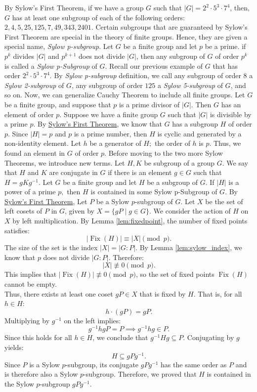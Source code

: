 \documentclass[a4paper,12pt]{article}
\begin{document}
By Sylow's First Theorem, if we have a group $G$ such that $|G|= 2^2 \cdot 5^3 \cdot 7^4$, then, $G$ has at least one subgroup of each of the following orders: $2,4,5,25,125,7,49,343,2401.$ Certain subgroups that are guaranteed by Sylow's First Theorem are special in the theory of finite groups. Hence, they are given a special name, \textit{Sylow p-subgroup}.
{
    Let $G$ be a finite group and let $p$ be a prime. if $p^k$ divides $|G|$ and $p^{k+1}$ does not divide $|G|$, then any subgroup of $G$ of order $p^k$ is called a \textit{Sylow p-Subgroup} of $G.$
}
Recall our previous example of $G$ that has order $2^2 \cdot 5^3 \cdot 7^4.$ By \textit{Sylow p-subgroup} definition, we call any subgroup of order $8$ a \textit{Sylow 2-subgroup} of $G$, any subgroup of order $125$ a \textit{Sylow 5-subgroup} of $G$, and so on.
Now, we can generalize Cauchy Theorem to include all finite groups.
{
        Let $G$ be a finite group, and suppose that $p$ is a prime divisor of $|G|$.
Then $G$ has an element of order $p$.
}
{
    Suppose we have a finite group $G$ such that $|G|$ is divisible by a prime $p.$ By \hyperref[thm:sylwfT]{Sylow's First Theorem}, we know that $G$ has a subgroup $H$ of order $p.$
    Since $|H|=p$ and $p$ is a prime number, then $H$ is cyclic and generated by a non-identity element. Let $h$ be a generator of $H;$ the order of $h$ is $p$. Thus, we found an element in $G$ of order $p.$ 
}
Before moving to the two more Sylow Theorems, we introduce new terms.
{
    Let $H,K$ be subgroup of a group $G.$ We say that $H$ and $K$ are conjugate in $G$ if there is an element $g\in G$ such that $H=gKg^{-1}.$ 
}
{
    Let $G$ be a finite group and let $H$ be a subgroup of $G.$ If $|H|$ is a power of a prime $p,$ then $H$ is contained in some Sylow p-Subgroup of $G.$
}
{
    By \hyperref[thm:sylwfT]{Sylow's First Theorem}, Let $P$ be a Sylow $p$-subgroup of $G$. Let $X$ be the set of left cosets of $P$ in $G$, given by $X = \{gP \mid g \in G\}$.
    We consider the action of $H$ on $X$ by left multiplication. By Lemma \ref{lem:fixedpoint}, the number of fixed points satisfies:
    \[ |\operatorname{Fix}(H)| \equiv |X| \pmod p. \]
    The size of the set is the index $|X| = |G:P|$. By Lemma \ref{lem:sylow_index}, we know that $p$ does not divide $|G:P|$. Therefore:
    \[ |X| \not\equiv 0 \pmod p. \]
    This implies that $|\operatorname{Fix}(H)| \not\equiv 0 \pmod p$, so the set of fixed points $\operatorname{Fix}(H)$ cannot be empty.
    \\Thus, there exists at least one coset $gP \in X$ that is fixed by $H$. That is, for all $h \in H$:
    \[ h \cdot (gP) = gP. \]
    Multiplying by $g^{-1}$ on the left implies:
    \[ g^{-1}hgP = P \implies g^{-1}hg \in P. \]
    Since this holds for all $h \in H$, we conclude that $g^{-1}Hg \subseteq P$. Conjugating by $g$ yields:
    \[ H \subseteq gPg^{-1}. \]
    Since $P$ is a Sylow $p$-subgroup, its conjugate $gPg^{-1}$ has the same order as $P$ and is therefore also a Sylow $p$-subgroup. Therefore, we proved that $H$ is contained in the Sylow $p$-subgroup $gPg^{-1}$.
}
\end{document}
